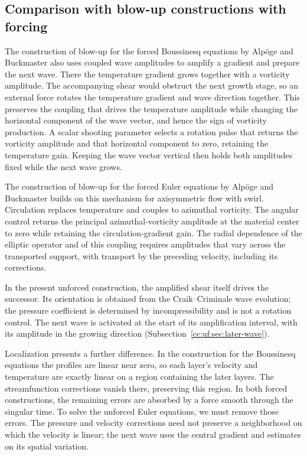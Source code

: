 \subsection{Comparison with blow-up constructions with forcing}
The construction of blow-up for the forced Boussinesq equations by
Alp\"oge and Buckmaster \cite[Section~1.2]{AlpogeBuckmasterBoussinesq}
also uses coupled wave
amplitudes to amplify a gradient and prepare the next wave. There the
temperature gradient grows together with a vorticity amplitude. The
accompanying shear would obstruct the next growth stage, so an external
force rotates the temperature gradient and wave direction together.
This preserves the coupling that drives the temperature amplitude while
changing the horizontal component of the wave vector, and hence the sign
of vorticity production. A scalar shooting parameter selects a rotation
pulse that returns the vorticity amplitude and that horizontal component
to zero, retaining the temperature gain. Keeping the wave vector vertical
then holds both amplitudes fixed while the next wave grows.

The construction of blow-up for the forced Euler equations by
Alp\"oge and Buckmaster \cite[Section~1.2]{AlpogeBuckmasterForcedEuler}
builds on this mechanism for axisymmetric flow with swirl. Circulation replaces temperature and
couples to azimuthal vorticity. The angular control returns the principal
azimuthal-vorticity amplitude at the material center to zero while
retaining the circulation-gradient gain. The radial dependence of the
elliptic operator and of this coupling requires amplitudes that vary
across the transported support, with transport by the preceding velocity,
including its corrections.

In the present unforced construction, the amplified shear itself drives the successor. Its orientation
is obtained from the Craik--Criminale wave evolution; the pressure coefficient
is determined by incompressibility and is not a rotation control.
The next wave is activated at the start of its amplification interval,
with its amplitude in the growing direction (Subsection~\ref{cc:uf:sec:later-wave}).

Localization presents a further difference. In the construction for
the Boussinesq equations the profiles are linear near zero, so each layer's velocity and temperature are exactly linear
on a region containing the later layers. The streamfunction corrections vanish there, preserving
this region. In both forced constructions, the remaining errors are
absorbed by a force smooth through the singular time. To solve the unforced Euler equations,
we must remove those errors. The pressure and velocity
corrections need not preserve a neighborhood on which the velocity is linear;
the next wave uses the central gradient and estimates on its spatial variation.

